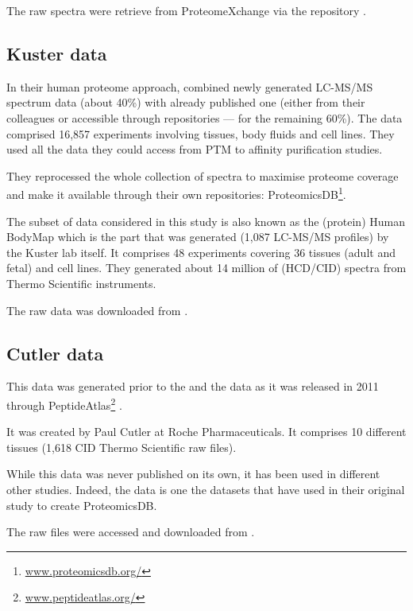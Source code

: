 The raw spectra were retrieve from ProteomeXchange via the repository
.

\subsection{Kuster data}

In their human proteome approach,
\cite{KusterData} combined newly generated \gls{LC-MS/MS} spectrum
data (about 40\%) with already published one
(either from their colleagues or accessible through repositories ---
for the remaining 60\%).
The data comprised 16,857 experiments involving tissues, body fluids and cell
lines. They used all the data they could access from \gls{PTM} to affinity
purification studies.

They reprocessed the whole collection of spectra to maximise proteome coverage
and make it available through their own repositories: ProteomicsDB\footnote{%
\href{https://www.proteomicsdb.org/}{www.proteomicsdb.org/}}.

The subset of data considered in this study is also
known as the (protein) Human BodyMap
which is the part that was generated (1,087 \gls{LC-MS/MS} profiles)
by the Kuster lab itself.
It comprises 48 experiments covering 36 tissues
(adult and fetal) and cell lines.
They generated about 14 million of (\gls{HCD}/\gls{CID}) spectra from Thermo
Scientific instruments.

The raw data was downloaded from .

\subsection{Cutler data}

This data was generated prior to the  and the 
data as it was released in 2011 through PeptideAtlas\footnote{%
\href{http://www.peptideatlas.org/}{www.peptideatlas.org/}}
\citep{PeptideAtlas}.

It was created by Paul Cutler at Roche Pharmaceuticals.
It comprises 10 different tissues (1,618 \gls{CID} Thermo Scientific raw files).

While this data was never published on its own, it has been used in different
other studies. Indeed, the  data is one the datasets that
\cite{KusterData} have used in their original study to create ProteomicsDB.

The raw files were accessed and downloaded from .

